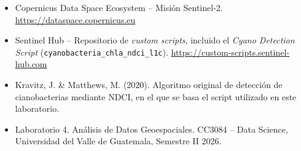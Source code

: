 \documentclass[11pt]{article}
\begin{document}
\begin{itemize}
    \item Copernicus Data Space Ecosystem -- Misi\'on Sentinel-2. \url{https://dataspace.copernicus.eu}
    \item Sentinel Hub -- Repositorio de \emph{custom scripts}, incluido el \emph{Cyano Detection Script} (\texttt{cyanobacteria\_chla\_ndci\_l1c}). \url{https://custom-scripts.sentinel-hub.com}
    \item Kravitz, J. \& Matthews, M. (2020). Algoritmo original de detecci\'on de cianobacterias mediante NDCI, en el que se basa el script utilizado en este laboratorio.
    \item Laboratorio 4. An\'alisis de Datos Geoespaciales. CC3084 -- Data Science, Universidad del Valle de Guatemala, Semestre II 2026.
\end{itemize}
\end{document}
